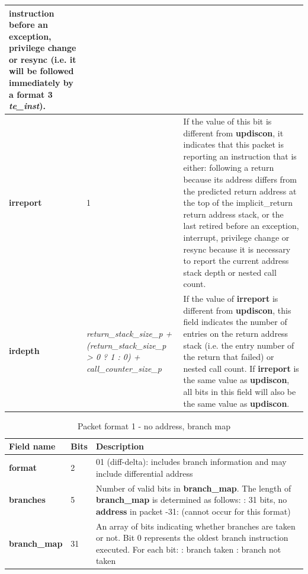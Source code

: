 \begin{table}[htp]
\begin{tabulary}{\textwidth}{|l|p{35mm}|p{90mm}|}
                instruction before an exception, privilege change or resync 
                (i.e. it will be followed immediately by a format 3 \textit{te\_inst}).\\
    \hline
    \textbf{irreport}	& 1 & 
                If the value of this bit is different from \textbf{updiscon}, it indicates that this packet is
                reporting an instruction that is either: \newline
                following a return because its address differs from the predicted return address at the top of 
                the implicit\_return return address stack, or \newline
                the last retired before an exception, interrupt, privilege change or resync because it is necessary to report 
                the current address stack depth or nested call count. \\
    \hline
    \textbf{irdepth}	& \textit {return\_stack\_size\_p + (return\_stack\_size\_p > 0 ? 1 : 0) + call\_counter\_size\_p} & 
                If the value of \textbf{irreport} is different from \textbf{updiscon}, this field 
		indicates the number of entries on the return address stack (i.e. the entry number of the return that
                failed) or nested call count.  If \textbf{irreport} is the same value as \textbf{updiscon}, 
                all bits in this field  will also be the same value as \textbf{updiscon}. \\
    \hline
  \end{tabulary}
\end{table}

\begin{table}[htp]
  \centering
  \caption{Packet format 1  - no address, branch map}
  \label{tab:te_inst1-noaddr-map}
  \begin{tabulary}{\textwidth}{|l|p{35mm}|p{90mm}|}
    \hline
    {\bf Field name} & {\bf Bits} & {\bf Description} \\
    \hline
    \textbf{format}	& 2	& 01 (diff-delta): includes branch information and may include differential address\\
    \hline
    \textbf{branches} & 5 & Number of valid bits in \textbf{branch\_map}. The length of \textbf{branch\_map} is determined as follows: :    31 bits, no \textbf{address} in packet -31: (cannot occur for this format) \\
    \hline
    \textbf{branch\_map} & 31 & 
                 An array of bits indicating whether branches are taken or not.\newline
    Bit 0 represents the oldest branch instruction executed.   For each bit: : branch taken : branch not taken \\
    \hline
  \end{tabulary}
\end{table}

